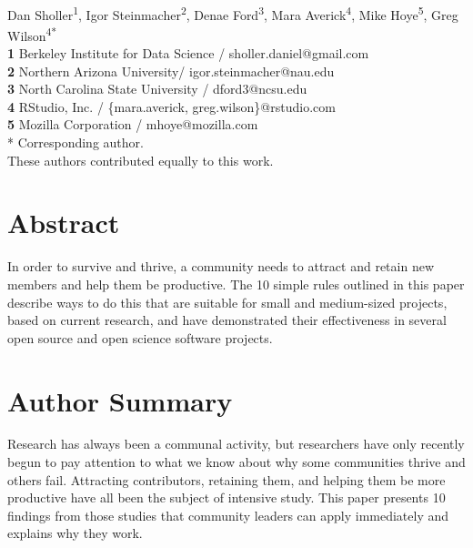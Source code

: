 \documentclass[10pt,letterpaper]{article}
\begin{document}
\vspace*{0.2in}

\begin{flushleft}
{\Large
\textbf{}
}
\newline
\\
{Dan Sholler}\textsuperscript{1{\ddag}},
{Igor Steinmacher}\textsuperscript{2{\ddag}},
{Denae Ford}\textsuperscript{3{\ddag}},
{Mara Averick}\textsuperscript{4{\ddag}},
{Mike Hoye}\textsuperscript{5{\ddag}},
{Greg Wilson}\textsuperscript{4{\ddag}*}
\\
\bigskip
\textbf{1} Berkeley Institute for Data Science / sholler.daniel@gmail.com \\
\textbf{2} Northern Arizona University/ igor.steinmacher@nau.edu \\
\textbf{3} North Carolina State University / dford3@ncsu.edu \\
\textbf{4} RStudio, Inc. / \{mara.averick, greg.wilson\}@rstudio.com \\
\textbf{5} Mozilla Corporation / mhoye@mozilla.com \\
* Corresponding author. \\
\bigskip
{\ddag} These authors contributed equally to this work.
\end{flushleft}

\section*{Abstract}

In order to survive and thrive,
a community needs to attract and retain new members
and help them be productive.
The 10 simple rules outlined in this paper
describe ways to do this that are suitable for small and medium-sized projects,
based on current research,
and have demonstrated their effectiveness
in several open source and open science software projects.

\section*{Author Summary}

Research has always been a communal activity,
but researchers have only recently begun to pay attention to
what we know about why some communities thrive and others fail.
Attracting contributors,
retaining them,
and helping them be more productive
have all been the subject of intensive study.
This paper presents 10 findings from those studies that community leaders can apply immediately
and explains why they work.
\end{document}
